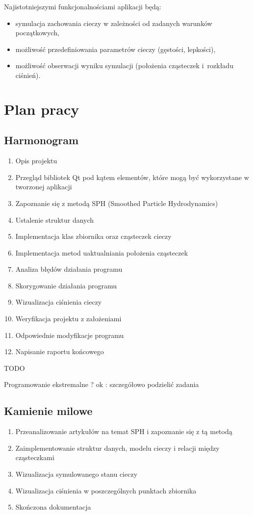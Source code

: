 \documentclass[a4paper]{article}
\begin{document}
Najistotniejszymi funkcjonalnościami aplikacji będą:
\begin{itemize}
  \item symulacja zachowania cieczy w zależności od zadanych warunków początkowych,
  \item możliwość przedefiniowania parametrów cieczy (gęstości, lepkości),
  \item możliwość obserwacji wyniku symulacji (położenia cząsteczek i~rozkładu ciśnień).
\end{itemize}

\section{Plan pracy}
\subsection{Harmonogram}
\begin{enumerate}[label=Z\arabic*{.}]
  \item Opis projektu
  \item Przegląd bibliotek Qt pod kątem elementów, które mogą być wykorzystane w tworzonej aplikacji
  \item Zapoznanie się z metodą SPH (Smoothed Particle Hydrodynamics)
  \item Ustalenie struktur danych
  \item Implementacja klas zbiornika oraz cząsteczek cieczy 
  \item Implementacja metod uaktualniania położenia cząsteczek
  \item Analiza błędów działania programu
  \item Skorygowanie działania programu
  \item Wizualizacja ciśnienia cieczy
  \item Weryfikacja projektu z założeniami
  \item Odpowiednie modyfikacje programu
  \item Napisanie raportu końcowego
\end{enumerate}
 
\begin{Huge} TODO \end{Huge}
Programowanie ekstremalne ? ok : szczegółowo podzielić zadania

\subsection{Kamienie milowe}
\begin{enumerate}[label=K\arabic*{.}]
  \item Przeanalizowanie artykułów na temat SPH i zapoznanie się z tą metodą
  \item Zaimplementowanie struktur danych, modelu cieczy i relacji między cząsteczkami
  \item Wizualizacja symulowanego stanu cieczy
  \item Wizualizacja ciśnienia w poszczególnych punktach zbiornika
  \item Skończona dokumentacja
\end{enumerate}
\end{document}
